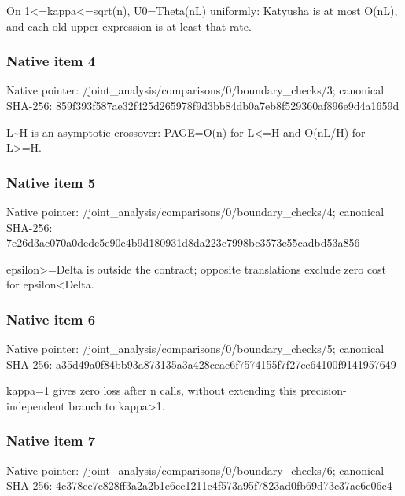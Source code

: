 \documentclass[10pt,a4paper]{article}
\begin{document}
\begingroup\raggedright\sloppy On 1<=\allowbreak{}kappa<=\allowbreak{}sqrt(n),\allowbreak{} U0=\allowbreak{}Theta(nL) uniformly:\allowbreak{} Katyusha is at most O(nL),\allowbreak{} and each old upper expression is at least that rate.\par\endgroup

\subsubsection{Native item 4}
Native pointer: /joint\_\allowbreak{}analysis/comparisons/0/boundary\_\allowbreak{}checks/3; canonical SHA-256: 859f393f587ae32f425d265978f9d3bb84db0a7eb8f529360af896e9d4a1659d

\begingroup\raggedright\sloppy L\textasciitilde{}H is an asymptotic crossover:\allowbreak{} PAGE=\allowbreak{}O(n) for L<=\allowbreak{}H and O(nL/\allowbreak{}H) for L>=\allowbreak{}H.\par\endgroup

\subsubsection{Native item 5}
Native pointer: /joint\_\allowbreak{}analysis/comparisons/0/boundary\_\allowbreak{}checks/4; canonical SHA-256: 7e26d3ac070a0dedc5e90e4b9d180931d8da223c7998bc3573e55cadbd53a856

\begingroup\raggedright\sloppy epsilon>=\allowbreak{}Delta is outside the contract;\allowbreak{} opposite translations exclude zero cost for epsilon<Delta.\par\endgroup

\subsubsection{Native item 6}
Native pointer: /joint\_\allowbreak{}analysis/comparisons/0/boundary\_\allowbreak{}checks/5; canonical SHA-256: a35d49a0f84bb93a873135a3a428ccac6f7574155f7f27cc64100f9141957649

\begingroup\raggedright\sloppy kappa=\allowbreak{}1 gives zero loss after n calls,\allowbreak{} without extending this precision-independent branch to kappa>1.\par\endgroup

\subsubsection{Native item 7}
Native pointer: /joint\_\allowbreak{}analysis/comparisons/0/boundary\_\allowbreak{}checks/6; canonical SHA-256: 4c378ce7e828ff3a2a2b1e6cc1211c4f573a95f7823ad0fb69d73c37ae6e06c4
\end{document}
